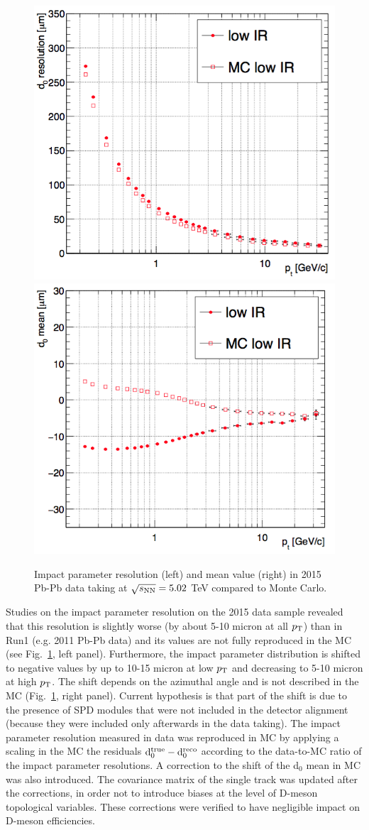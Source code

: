 \begin{figure}[!htb]
 \begin{center}
\includegraphics[width=.49\textwidth]{./FigCap5/d0Reso.png}
\includegraphics[width=.49\textwidth]{./FigCap5/d0Mean.png}
\end{center}
 \caption{Impact parameter resolution (left) and mean value (right) in 2015 Pb-Pb data taking at $\sqrt{s_{\rm NN}} = 5.02$ TeV compared to Monte Carlo.}
 \label{fig:d0}
\end{figure}
Studies on the impact parameter resolution on the 
2015 data sample revealed that this resolution is 
slightly worse (by about 5-10 micron at all $p_{\rm T}$) 
than in Run1 (e.g. 2011 Pb-Pb data) and its values are not fully reproduced
in the MC (see Fig.~\ref{fig:d0}, left panel).
Furthermore, the impact parameter distribution is shifted to negative 
values by up to 10-15 micron at low $p_{\rm T}$ and 
decreasing to 5-10 micron at high $p_{\rm T}$. The shift 
depends on the azimuthal angle and is not described 
in the MC (Fig.~\ref{fig:d0}, right panel). Current hypothesis is that part of the shift 
is due to the presence of SPD modules that were not 
included in the detector alignment (because they were
 included only afterwards in the data taking). 
 The impact parameter resolution measured in data 
 was reproduced in MC by applying a scaling in the 
 MC the residuals ${\rm d}_0^{\rm true}-{\rm d}_0^{\rm reco}$ 
 according to the data-to-MC ratio of the impact parameter 
 resolutions. A correction to the shift of the d$_0$ mean in MC was 
 also introduced. The covariance matrix of the single track was 
 updated after the corrections, in order not to introduce biases at the level
 of D-meson topological variables. These corrections were verified
 to have negligible impact on D-meson efficiencies.\\
 



